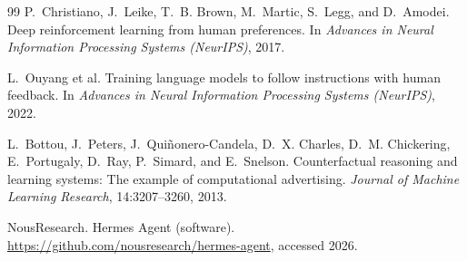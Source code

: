 \documentclass[11pt]{article}
\begin{document}
\begin{thebibliography}{99}
P.~Christiano, J.~Leike, T.~B. Brown, M.~Martic, S.~Legg, and D.~Amodei.
\newblock Deep reinforcement learning from human preferences.
\newblock In \emph{Advances in Neural Information Processing Systems (NeurIPS)}, 2017.

L.~Ouyang et al.
\newblock Training language models to follow instructions with human feedback.
\newblock In \emph{Advances in Neural Information Processing Systems (NeurIPS)}, 2022.

L.~Bottou, J.~Peters, J.~Qui\~{n}onero-Candela, D.~X. Charles, D.~M. Chickering,
E.~Portugaly, D.~Ray, P.~Simard, and E.~Snelson.
\newblock Counterfactual reasoning and learning systems: The example of computational advertising.
\newblock \emph{Journal of Machine Learning Research}, 14:3207--3260, 2013.

NousResearch.
\newblock Hermes Agent (software).
\newblock \url{https://github.com/nousresearch/hermes-agent}, accessed 2026.

\end{thebibliography}
\end{document}
